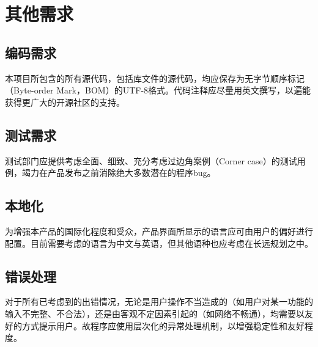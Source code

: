 \chapter{其他需求}


\section{编码需求}
本项目所包含的所有源代码，包括库文件的源代码，均应保存为无字节顺序标记（Byte-order Mark，BOM）的UTF-8格式。代码注释应尽量用英文撰写，以遍能获得更广大的开源社区的支持。

\section{测试需求}
测试部门应提供考虑全面、细致、充分考虑过边角案例（Corner case）的测试用例，竭力在产品发布之前消除绝大多数潜在的程序bug。

\section{本地化}
为增强本产品的国际化程度和受众，产品界面所显示的语言应可由用户的偏好进行配置。目前需要考虑的语言为中文与英语，但其他语种也应考虑在长远规划之中。

\section{错误处理}
对于所有已考虑到的出错情况，无论是用户操作不当造成的（如用户对某一功能的输入不完整、不合法），还是由客观不定因素引起的（如网络不畅通），均需要以友好的方式提示用户。故程序应使用层次化的异常处理机制，以增强稳定性和友好程度。